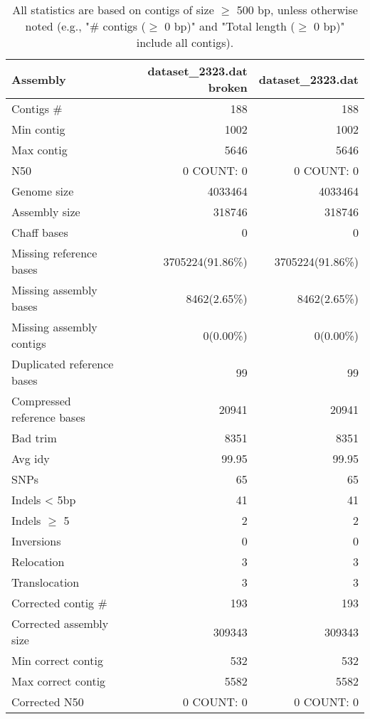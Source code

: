 \documentclass[12pt,a4paper]{article}
\begin{document}
\begin{table}[ht]
\begin{center}
\caption{All statistics are based on contigs of size $\geq$ 500 bp, unless otherwise noted (e.g., "\# contigs ($\geq$ 0 bp)" and "Total length ($\geq$ 0 bp)" include all contigs).}
\begin{tabular}{|l*{2}{|r}|}
\hline
Assembly & dataset\_2323.dat broken & dataset\_2323.dat \\ \hline
Contigs \# & 188 & 188 \\ \hline
Min contig & 1002 & 1002 \\ \hline
Max contig & 5646 & 5646 \\ \hline
N50 & 0 COUNT: 0 & 0 COUNT: 0 \\ \hline
Genome size & 4033464 & 4033464 \\ \hline
Assembly size & 318746 & 318746 \\ \hline
Chaff bases & 0 & 0 \\ \hline
Missing reference bases & 3705224(91.86\%) & 3705224(91.86\%) \\ \hline
Missing assembly bases & 8462(2.65\%) & 8462(2.65\%) \\ \hline
Missing assembly contigs & 0(0.00\%) & 0(0.00\%) \\ \hline
Duplicated reference bases & 99 & 99 \\ \hline
Compressed reference bases & 20941 & 20941 \\ \hline
Bad trim & 8351 & 8351 \\ \hline
Avg idy & 99.95 & 99.95 \\ \hline
SNPs & 65 & 65 \\ \hline
Indels < 5bp & 41 & 41 \\ \hline
Indels $\geq$ 5 & 2 & 2 \\ \hline
Inversions & 0 & 0 \\ \hline
Relocation & 3 & 3 \\ \hline
Translocation & 3 & 3 \\ \hline
Corrected contig \# & 193 & 193 \\ \hline
Corrected assembly size & 309343 & 309343 \\ \hline
Min correct contig & 532 & 532 \\ \hline
Max correct contig & 5582 & 5582 \\ \hline
Corrected N50 & 0 COUNT: 0 & 0 COUNT: 0 \\ \hline
\end{tabular}
\end{center}
\end{table}
\end{document}
